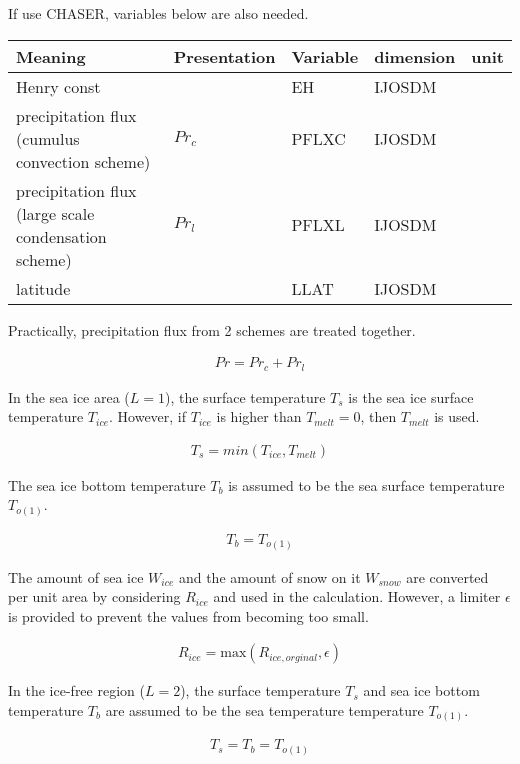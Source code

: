 If use CHASER, variables below are also needed.

\setlength\LTleft{0pt}\setlength\LTright{0pt}\begin{longtable}[]{@{}lllll@{}}
\toprule\relax
Meaning & Presentation & Variable & dimension & unit \\
\midrule\relax
\endhead
Henry const & & EH & IJOSDM & \\
precipitation flux (cumulus convection scheme) & \(Pr_c\) & PFLXC &
IJOSDM & \\
precipitation flux (large scale condensation scheme) & \(Pr_l\) & PFLXL
& IJOSDM & \\
latitude & & LLAT & IJOSDM & \\
\bottomrule
\end{longtable}

Practically, precipitation flux from 2 schemes are treated together.

\begin{eqnarray}
    Pr = Pr_c + Pr_l
\end{eqnarray}

In the sea ice area (\(L=1\)), the surface temperature \(T_s\) is the
sea ice surface temperature \(T_{ice}\). However, if \(T_{ice}\) is
higher than \(T_{melt}=0\), then \(T_{melt}\) is used.

\begin{eqnarray}
    T_s = min(T_{ice},T_{melt})
\end{eqnarray}

The sea ice bottom temperature \(T_b\) is assumed to be the sea surface
temperature \(T_{o(1)}\).

\begin{eqnarray}
    T_b = T_{o(1)}
\end{eqnarray}

The amount of sea ice \(W_{ice}\) and the amount of snow on it
\(W_{snow}\) are converted per unit area by considering \(R_{ice}\) and
used in the calculation. However, a limiter \(\epsilon\) is provided to
prevent the values from becoming too small.

\begin{eqnarray}
R_{ice} =\mathrm{max}( R_{ice,orginal}, \epsilon)
\end{eqnarray}

In the ice-free region (\(L=2\)), the surface temperature \(T_s\) and
sea ice bottom temperature \(T_b\) are assumed to be the sea temperature
temperature \(T_{o(1)}\).

\begin{eqnarray}
    T_s = T_b = T_{o(1)}
\end{eqnarray}

